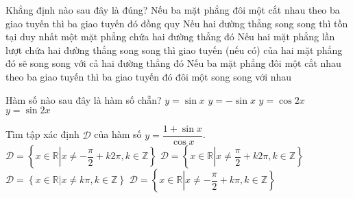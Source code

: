 \begin{ex}%
	Khẳng định nào sau đây là đúng?
	\choice
	{Nếu ba mặt phẳng đôi một cắt nhau theo ba giao tuyến thì ba giao tuyến đó đồng quy}
	{\True Nếu hai đường thẳng song song thì tồn tại duy nhất một mặt phẳng chứa hai đường thẳng đó}
	{Nếu hai mặt phẳng lần lượt chứa hai đường thẳng song song thì giao tuyến (nếu có) của hai mặt phẳng đó sẽ song song với cả hai đường thẳng đó}
	{Nếu ba mặt phẳng đôi một cắt nhau theo ba giao tuyến thì ba giao tuyến đó đôi một song song với nhau}
\end{ex}

\begin{ex}%
	Hàm số nào sau đây là hàm số chẵn?
	\choice
	{$y=\sin x$}
	{$y=-\sin x$}
	{\True $y=\cos2x$}
	{$y=\sin2x$}
\end{ex}

\begin{ex}%
	Tìm tập xác định $\mathscr{D}$ của hàm số $y=\dfrac{1+\sin x}{\cos x}$.
	\choice
	{$\mathscr{D}=\left\{x\in \mathbb{R}\left|x\neq -\dfrac{\pi}{2}+k2\pi\right.,k\in\mathbb{Z}\right\}$}
	{$\mathscr{D}=\left\{x\in \mathbb{R}\left|x\neq \dfrac{\pi}{2}+k2\pi\right.,k\in\mathbb{Z}\right\}$}
	{$\mathscr{D}=\left\{x\in \mathbb{R}\left|x\neq k\pi\right.,k\in\mathbb{Z}\right\}$}
	{\True $\mathscr{D}=\left\{x\in \mathbb{R}\left|x\neq -\dfrac{\pi}{2}+k\pi\right.,k\in\mathbb{Z}\right\}$}
\end{ex}

